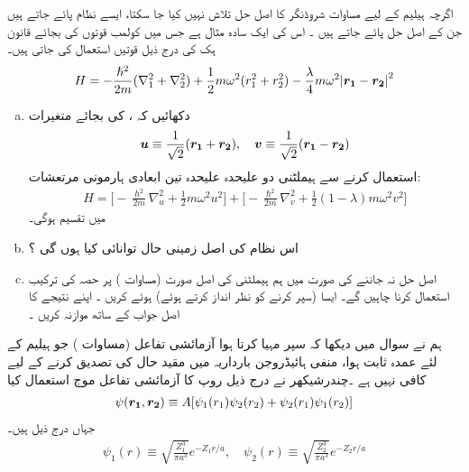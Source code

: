 اگرچہ ہیلیم کے لیے مساوات شروڈنگر کا  اصل    حل  تلاش نہیں کیا جا سکتا،  ایسے    نظام پائے جاتے ہیں جن کے  اصل  حل پائے جاتے  ہیں ۔ اس کی ایک  سادہ مثال ہے جس میں کولمب قوتوں  کی بجائے قانون ہک کی درج ذیل قوتیں استعمال  کی جاتی ہیں۔
\begin{align}\label{مساوات_تغیریت_اصل_ہیملٹنی_ربڑی}
H=-\frac{\hslash^{2}}{2m}(\nabla_{1}^{2}+\nabla_{2}^{2})+\frac{1}{2}m\omega^{2}(r_{1}^{2}+r_{2}^{2})-\frac{\lambda}{4}m\omega^{2}\abs{{{\boldsymbol{r_{1}}}}-{{\boldsymbol{r_{2}}}}}^{2} 
\end{align}
\begin{enumerate}[a.]
\item
 دکھائیں کہ  ،    کی بجائے متغیرات
\begin{align}
{\ensuremath{{\boldsymbol{u}}}}\equiv\frac{1}{\sqrt{2}}({{\boldsymbol{r_{1}}}}+{{\boldsymbol{r_{2}}}}), \quad {\ensuremath{{\boldsymbol{v}}}}\equiv\frac{1}{\sqrt{2}}({{\boldsymbol{r_{1}}}}-{{\boldsymbol{r_{2}}}})
\end{align}
 استعمال کرنے سے ہیملٹنی دو علیحدہ علیحدہ تین ابعادی  ہارمونی  مرتعشات:
\begin{align}
H=\Big[-\frac{\hslash^{2}}{2m}\nabla_{u}^{2}+\frac{1}{2}m\omega^{2}u^{2}\Big]+\Big[-\frac{\hslash^{2}}{2m}\nabla_{v}^{2}+\frac{1}{2}(1-\lambda)m\omega^{2}v^{2}\Big]
\end{align}
  میں تقسیم ہوگی۔
\item
 اس نظام کی  اصل  زمینی حال توانائی کیا ہوں گی ؟
\item
 اصل  حل نہ جاننے کی  صورت میں ہم ہیملٹنی کی اصل صورت  (مساوات )   پر حصہ    کی ترکیب استعمال کرنا چاہیں گے۔
ایسا (سپر کرنے کو نظر انداز کرتے ہوئے)   ہوئے کریں ۔ اپنے نتیجے کا    اصل جواب کے ساتھ موازنہ کریں ۔    
\end{enumerate}
ہم نے سوال    میں دیکھا کہ  سپر مہیا کرتا ہوا آزمائشی تفاعل    (مساوات   ) جو  ہیلیم کے لئے عمدہ ثابت ہوا،   منفی ہائیڈروجن بارداریہ میں مقید حال  کی تصدیق کرنے کے لیے کافی نہیں ہے ۔چندرشیکھر  نے درج ذیل روپ  کا آزمائشی  تفاعل موج استعمال کیا
\begin{align}
\psi({{\boldsymbol{r_{1}}}},{{\boldsymbol{r_{2}}}})\equiv A[\psi_{1}(r_{1})\psi_{2}(r_{2})+\psi_{2}(r_{1})\psi_{1}(r_{2})]
\end{align}
 جہاں درج ذیل ہیں۔
\begin{align}
\psi_{1}(r)\equiv \sqrt{\frac{Z_{1}^{3}}{\pi a^{3}}}e^{-Z_{1}r/a}, \quad \psi_{2}(r)\equiv \sqrt{\frac{Z_{2}^{3}}{\pi a^{3}}}e^{-Z_{2}r/a} 
\end{align}
 
